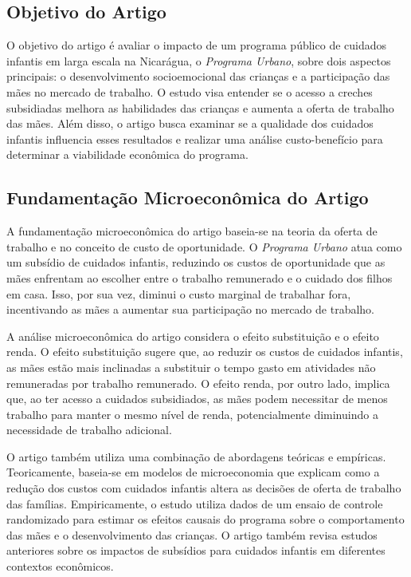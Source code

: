 \documentclass[a4paper,12pt]{article}[abntex2]
\begin{document}
\subsection{\textbf{Objetivo do Artigo}}
O objetivo do artigo é avaliar o impacto de um programa público de cuidados infantis em larga escala na Nicarágua, o \textit{Programa Urbano}, sobre dois aspectos principais: o desenvolvimento socioemocional das crianças e a participação das mães no mercado de trabalho. O estudo visa entender se o acesso a creches subsidiadas melhora as habilidades das crianças e aumenta a oferta de trabalho das mães. Além disso, o artigo busca examinar se a qualidade dos cuidados infantis influencia esses resultados e realizar uma análise custo-benefício para determinar a viabilidade econômica do programa.
\subsection{\textbf{Fundamentação Microeconômica do Artigo}}

A fundamentação microeconômica do artigo baseia-se na teoria da oferta de trabalho e no conceito de custo de oportunidade. O \textit{Programa Urbano} atua como um subsídio de cuidados infantis, reduzindo os custos de oportunidade que as mães enfrentam ao escolher entre o trabalho remunerado e o cuidado dos filhos em casa. Isso, por sua vez, diminui o custo marginal de trabalhar fora, incentivando as mães a aumentar sua participação no mercado de trabalho.

A análise microeconômica do artigo considera o efeito substituição e o efeito renda. O efeito substituição sugere que, ao reduzir os custos de cuidados infantis, as mães estão mais inclinadas a substituir o tempo gasto em atividades não remuneradas por trabalho remunerado. O efeito renda, por outro lado, implica que, ao ter acesso a cuidados subsidiados, as mães podem necessitar de menos trabalho para manter o mesmo nível de renda, potencialmente diminuindo a necessidade de trabalho adicional.

O artigo também utiliza uma combinação de abordagens teóricas e empíricas. Teoricamente, baseia-se em modelos de microeconomia que explicam como a redução dos custos com cuidados infantis altera as decisões de oferta de trabalho das famílias. Empiricamente, o estudo utiliza dados de um ensaio de controle randomizado para estimar os efeitos causais do programa sobre o comportamento das mães e o desenvolvimento das crianças. O artigo também revisa estudos anteriores sobre os impactos de subsídios para cuidados infantis em diferentes contextos econômicos.
\end{document}
